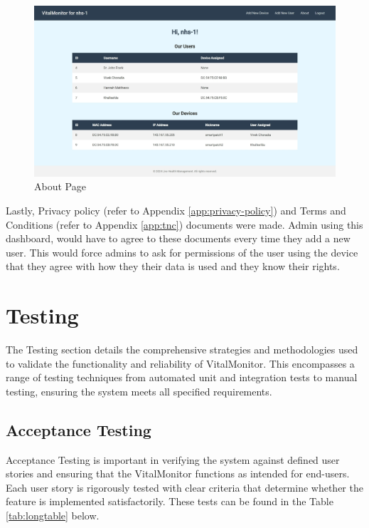 \begin{figure}[h!]
    \centering
    \includegraphics[width=1\linewidth]{images/dashboard-2.jpeg}
    \caption{About Page}
    \label{fig:about-page}
\end{figure}

\clearpage
\noindent Lastly, Privacy policy (refer to Appendix \ref{app:privacy-policy}) and Terms and Conditions (refer to Appendix \ref{app:tnc}) documents were made. Admin using this dashboard, would have to agree to these documents every time they add a new user. This would force admins to ask for permissions of the user using the device that they agree with how they their data is used and they know their rights. 


\section{Testing}
The Testing section details the comprehensive strategies and methodologies used to validate the functionality and reliability of VitalMonitor. This encompasses a range of testing techniques from automated unit and integration tests to manual testing, ensuring the system meets all specified requirements.

\subsection {Acceptance Testing}
Acceptance Testing is important in verifying the system against defined user stories and ensuring that the VitalMonitor functions as intended for end-users. Each user story is rigorously tested with clear criteria that determine whether the feature is implemented satisfactorily. These tests can be found in the Table \ref{tab:longtable} below.



